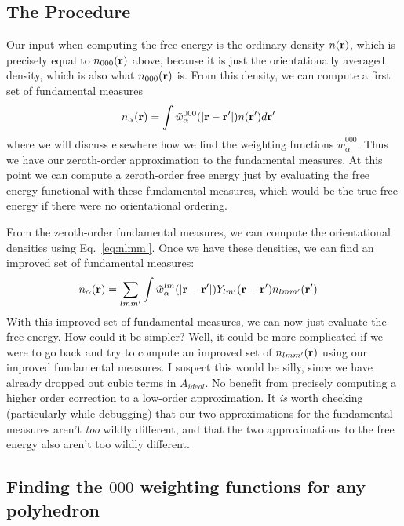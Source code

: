 \documentclass[letterpaper,twocolumn,amsmath,amssymb,pre]{revtex4-1}
\begin{document}
\subsection{The Procedure}
Our input when computing the free energy is the ordinary density
$n(\mathbf{r})$, which is precisely equal to $n_{000}(\mathbf{r})$ above, because it
is just the orientationally averaged density, which is also what
$n_{000}(\mathbf{r})$ is.  From this density, we can compute a first set of
fundamental measures
\begin{align}
  n_\alpha(\mathbf{r}) &= \int \tilde{w}_\alpha^{000}(|\mathbf{r}-\mathbf{r}'|)n(\mathbf{r}')d\mathbf{r}'
\end{align}
where we will discuss elsewhere how we find the weighting functions
$\tilde{w}_\alpha^{000}$.  Thus we have our zeroth-order approximation
to the fundamental measures.  At this point we can compute a
zeroth-order free energy just by evaluating the free energy functional
with these fundamental measures, which would be the true free energy
if there were no orientational ordering.

From the zeroth-order fundamental measures, we can
compute the orientational densities using Eq.~\ref{eq:nlmm'}.  Once we
have these densities, we can find an improved set of fundamental
measures:
\begin{align}
  n_\alpha(\mathbf{r}) &= \sum_{lmm'} \int
  \tilde{w}_\alpha^{lm}(|\mathbf{r}-\mathbf{r}'|) Y_{lm'}(\mathbf{r}-\mathbf{r}')n_{lmm'}(\mathbf{r}')
\end{align}
With this improved set of fundamental measures, we can now just
evaluate the free energy.  How could it be simpler? Well, it could be
more complicated if we were to go back and try to compute an improved
set of $n_{lmm'}(\mathbf{r})$ using our improved fundamental measures.  I
suspect this would be silly, since we have already dropped out cubic
terms in $A_{\textit{ideal}}$.  No benefit from precisely computing a
higher order correction to a low-order approximation.  It \emph{is}
worth checking (particularly while debugging) that our two
approximations for the fundamental measures aren't \emph{too} wildly
different, and that the two approximations to the free energy also
aren't too wildly different.

\subsection{Finding the $000$ weighting functions for any polyhedron}

\newcommand\xhat{\mathbf{\hat{x}}}
\newcommand\yhat{\mathbf{\hat{y}}}
\newcommand\zhat{\mathbf{\hat{z}}}
\newcommand\facehat{\mathbf{\hat{f}}}
\newcommand\Rface{\ensuremath{R_f}}
\newcommand\Rvertex{\ensuremath{R_v}}
\end{document}
